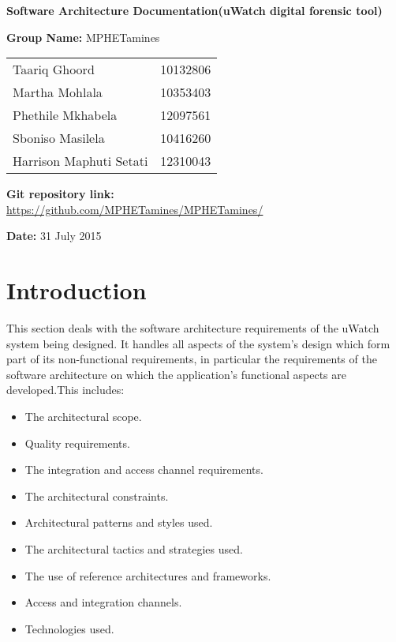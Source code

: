 \documentclass[a4paper,12pt]{article}
\begin{document}
\begin{center}

\Huge\textbf{Software Architecture Documentation(uWatch digital forensic tool)\\}
																											
\vspace{2 cm}

\LARGE\textbf{Group Name:} MPHETamines\newline
 
 
 
 
 
\vspace{0.5 cm}
\begin{tabular}{lr}
Taariq Ghoord&10132806
\\ 
Martha Mohlala&10353403
\\
Phethile Mkhabela&12097561
\\
Sboniso Masilela&10416260
\\
Harrison Maphuti Setati&12310043\\
\end{tabular}

\vspace{1cm}
\textbf{Git repository link:\\}
\url{https://github.com/MPHETamines/MPHETamines/}

\vspace{1cm}
\textbf{Date:} 31 July 2015
\end{center}
\newpage

\tableofcontents

\newpage
{}

\section{Introduction}
This section deals with the software architecture requirements of the uWatch
system being designed. It handles all aspects of the system's design which
form part of its non-functional requirements, in particular the requirements
of the software architecture on which the application's functional aspects are
developed.This includes:
\begin{itemize}
\item The architectural scope.
\item Quality requirements.
\item The integration and access channel requirements.
\item The architectural constraints.
\item Architectural patterns and styles used.
\item The architectural tactics and strategies used.
\item The use of reference architectures and frameworks.
\item Access and integration channels.
\item Technologies used.
\end{itemize}
\end{document}
